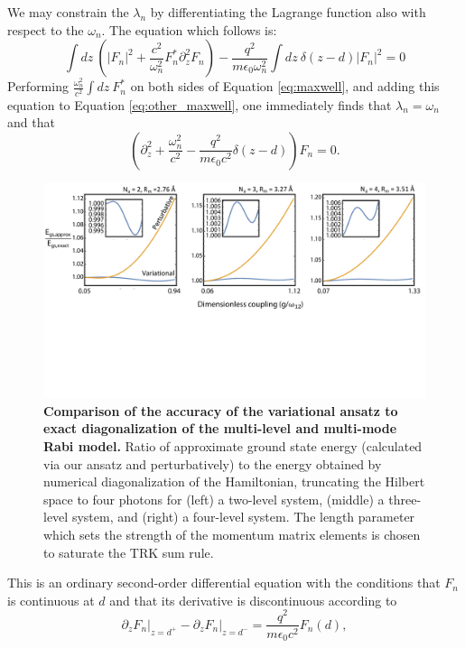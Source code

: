 \documentclass[aps,prb,twocolumn,
	groupedaddress,superscriptaddress,
	amsfonts,amssymb,amsmath,floatfix,
	citeautoscript]{revtex4-1}
\begin{document}
We may constrain the $\lambda_n$ by differentiating the Lagrange function also with respect to the $\omega_n$. The equation which follows is:
\begin{equation}\label{eq:other_maxwell}
\int dz ~\left(|F_n|^2 + \frac{c^2}{\omega^2_n}F_n^*\partial_z^2F_n\right) - \frac{ q^2}{m\epsilon_0\omega^2_n} \int dz~\delta(z-d)|F_n|^2 = 0
\end{equation}
Performing $\frac{\omega_n^2}{c^2}\int dz~F_n^*$ on both sides of Equation \ref{eq:maxwell}, and adding this equation to Equation \ref{eq:other_maxwell}, one immediately finds that $\lambda_n = \omega_n$ and that
\begin{equation}\label{eq:final_maxwell}
\left(\partial_z^2+\frac{\omega^2_n}{c^2}-\frac{q^2 }{m\epsilon_0 c^2}\delta(z-d)\right)F_n  = 0.
\end{equation}
\begin{figure}[t]
\includegraphics[width=16cm]{fig2.pdf}
\caption{\textbf{Comparison of the accuracy of the variational ansatz to exact diagonalization of the multi-level and multi-mode Rabi model.} Ratio of approximate ground state energy (calculated via our ansatz and perturbatively) to the energy obtained by numerical diagonalization of the Hamiltonian, truncating the Hilbert space to four photons for (left) a two-level system, (middle) a three-level system, and (right) a four-level system. The length parameter which sets the strength of the momentum matrix elements is chosen to saturate the TRK sum rule.}
\label{fig:decoupling}
\end{figure}
This is an ordinary second-order differential equation with the conditions that $F_n$ is continuous at $d$ and that its derivative is discontinuous according to 
\begin{equation}\label{eq:boundary_condition}
\partial_zF_n\Big|_{z=d^+}-\partial_zF_n\Big|_{z=d^-} = \frac{q^2}{m\epsilon_0 c^2}F_n(d),
\end{equation}
\end{document}
